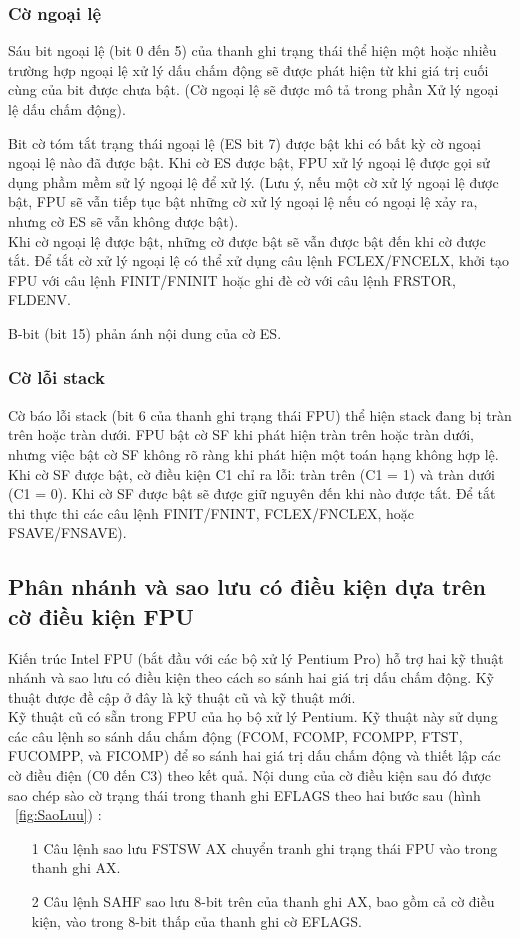 		\subsubsection*{ Cờ ngoại lệ}
	Sáu bit ngoại lệ (bit 0 đến 5) của thanh ghi trạng thái thể hiện một hoặc nhiều trường hợp ngoại lệ xử lý dấu chấm động sẽ được phát hiện từ khi giá trị cuối cùng của bit được chưa bật. (Cờ ngoại lệ sẽ được mô tả trong phần Xử lý ngoại lệ dấu chấm động). 

	Bit cờ tóm tắt trạng thái ngoại lệ (ES bit 7) được bật khi có bất kỳ cờ ngoại ngoại lệ nào đã được bật. Khi cờ ES được bật, FPU xử lý ngoại lệ được gọi sử dụng phầm mềm sử lý ngoại lệ để xử lý. (Lưu ý, nếu một cờ xử lý ngoại lệ được bật, FPU sẽ vẫn tiếp tục bật những cờ xử lý ngoại lệ nếu có ngoại lệ xảy ra, nhưng cờ ES sẽ vẫn không được bật). \\
	
	Khi cờ ngoại lệ được bật, những cờ được bật sẽ vẫn được bật đến khi cờ được tắt. Để tắt cờ xử lý ngoại lệ có thể xử dụng câu lệnh FCLEX/FNCELX, khởi tạo FPU với câu lệnh FINIT/FNINIT hoặc ghi đè cờ với câu lệnh FRSTOR, FLDENV. 
			
		B-bit (bit 15) phản ánh nội dung của cờ ES. 
				
		\subsubsection*{ Cờ lỗi stack}
	Cờ báo lỗi stack (bit 6 của thanh ghi trạng thái FPU) thể hiện stack đang bị tràn trên hoặc tràn dưới. FPU bật cờ SF khi phát hiện tràn trên hoặc tràn dưới, nhưng việc bật cờ SF không rõ ràng khi phát hiện một toán hạng không hợp lệ. Khi cờ SF được bật,  cờ điều kiện C1 chỉ ra lỗi: tràn trên (C1 = 1) và tràn dưới (C1 = 0). Khi cờ SF được bật sẽ được giữ nguyên đến khi nào được tắt. Để tắt thi thực thi các câu lệnh FINIT/FNINT, FCLEX/FNCLEX, hoặc FSAVE/FNSAVE).

		\subsection*{ Phân nhánh và sao lưu có điều kiện dựa trên cờ điều kiện FPU}
	Kiến trúc Intel FPU (bắt đầu với các bộ xử lý Pentium Pro) hỗ trợ hai kỹ thuật nhánh và sao lưu có điều kiện theo cách so sánh hai giá trị dấu chấm động. Kỹ thuật được đề cập ở đây là kỹ thuật cũ và kỹ thuật mới.\\
	
	Kỹ thuật cũ có sẵn trong FPU của họ bộ xử lý Pentium. Kỹ thuật này sử dụng các câu lệnh so sánh dấu chấm động (FCOM, FCOMP, FCOMPP, FTST, FUCOMPP, và FICOMP) để so sánh hai giá trị dấu chấm động và thiết lập các cờ điều điện (C0 đến C3) theo kết quả. Nội dung của cờ điều kiện sau đó được sao chép sào cờ trạng thái trong thanh ghi EFLAGS theo hai bước sau (hình ~\ref{fig:SaoLuu}) : 
	\begin{itemize}
		\item[1] Câu lệnh sao lưu FSTSW AX chuyển tranh ghi trạng thái FPU vào trong thanh ghi AX.
		\item[2]	Câu lệnh SAHF sao lưu 8-bit trên của thanh ghi AX, bao gồm cả cờ điều kiện, vào trong 8-bit thấp của thanh ghi cờ EFLAGS. 
	\end{itemize}

